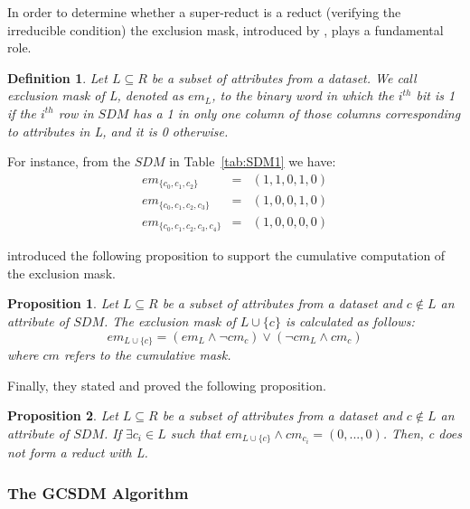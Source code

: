\documentclass[authoryear,11pt]{elsarticle}
\newtheorem{proposition}{Proposition}
\newtheorem{definition}{Definition}
\begin{document}
	In order to determine whether a super-reduct is a reduct (verifying the irreducible condition) the
	exclusion mask, introduced by \cite{Lias09}, plays a fundamental role. 
	
	\begin{definition}\label{def:exclusion}
		Let $L \subseteq R$ be a subset of attributes from a dataset. We call exclusion mask of L, denoted as 
		$em_L$, to the binary word in which the $i^{\mathit{th}}$ bit is 1 if the $i^{\mathit{th}}$ row in $SDM$
		has a 1 in only one 	column of those columns corresponding to attributes in L, and it is 0 otherwise.
	\end{definition}
	
	For instance, from the $SDM$ in Table~\ref{tab:SDM1} we have:
	$$\begin{array}{lcc}
	  em_{\lbrace c_0,c_1,c_2\rbrace}         &=& (1,1,0,1,0)\\
	  em_{\lbrace c_0,c_1,c_2,c_3\rbrace}     &=& (1,0,0,1,0)\\
	  em_{\lbrace c_0,c_1,c_2,c_3,c_4\rbrace} &=& (1,0,0,0,0)
	\end{array}$$
	
	\cite{Lias13} introduced the following proposition to support the cumulative computation of the exclusion mask.
	
	\begin{proposition}\label{prop:cumul} 
		Let $L \subseteq R$ be a subset of attributes from a dataset and $c \notin L$ an attribute of $SDM$.
		The exclusion mask of $L \cup \lbrace c\rbrace$ is calculated as follows:
		$$em_{L \cup \lbrace c\rbrace}=(em_L \wedge \neg cm_c) \vee (\neg cm_L \wedge cm_c)$$
		where $cm$ refers to the cumulative mask.
	\end{proposition}
	
	Finally, they stated and proved the following proposition.
	
	\begin{proposition}\label{prop:exclude} 
		Let $L \subseteq R$ be a subset of attributes from a dataset and $c \notin L$ an attribute of $SDM$.
		If $\exists c_i \in L$ such that $em_{L \cup \lbrace c\rbrace} \wedge cm_{c_i}=(0,...,0)$. Then, c
		does not form a reduct with L.
	\end{proposition}
	
	
\subsubsection{The GCSDM Algorithm}	
\end{document}
